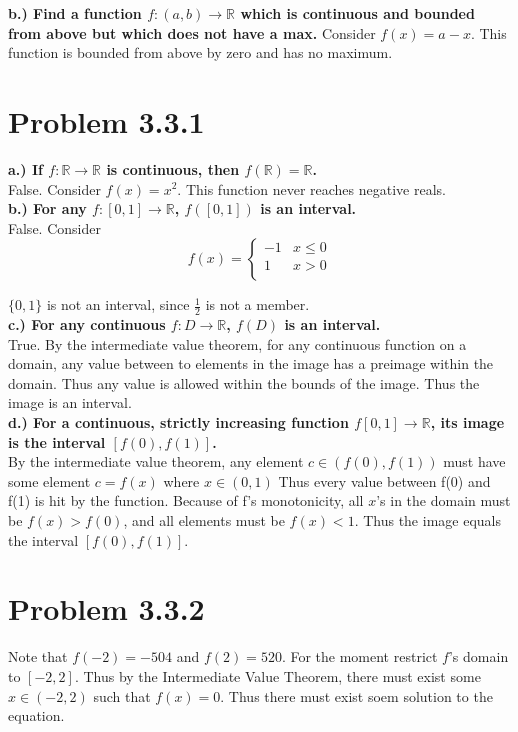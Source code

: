 \documentclass[10pt]{article} %
\begin{document}
\textbf{b.) Find a function $f:(a,b)\rightarrow\mathbb{R}$ which is continuous and bounded from above but which does not have a max.}
Consider $f(x) = a-x$. This function is bounded from above by zero and has no maximum.\\

\section{Problem 3.3.1}
\textbf{a.) If $f:\mathbb{R}\rightarrow\mathbb{R}$ is continuous, then $f(\mathbb{R}) = \mathbb{R}$.}\\
False. Consider $f(x) = x^2$. This function never reaches negative reals.\\

\textbf{b.) For any $f:[0,1]\rightarrow\mathbb{R}$, $f([0,1])$ is an interval.}\\
False. Consider\\

\[
f(x) =
\begin{cases} 
      -1 & x\leq 0 \\
      1  & x > 0 \\
   \end{cases}
\]

$\{0,1\}$ is not an interval, since $\frac12$ is not a member.\\

\textbf{c.) For any continuous $f:D\rightarrow\mathbb{R}$, $f(D)$ is an interval.}\\
True. By the intermediate value theorem, for any continuous function on a domain, any value between to elements in the image has a preimage within the domain. Thus any value is allowed within the bounds of the image. Thus the image is an interval.\\

\textbf{d.) For a continuous, strictly increasing function $f[0,1]\rightarrow\mathbb{R}$, its image is the interval $[f(0), f(1)]$.}\\
By the intermediate value theorem, any element $c \in (f(0), f(1))$ must have some element $c = f(x)$ where $x \in (0,1)$ Thus every value between f(0) and f(1) is hit by the function. Because of f's monotonicity, all $x$'s in the domain must be $f(x) > f(0)$, and all elements must be $f(x) < 1$. Thus the image equals the interval $[f(0), f(1)]$.\\

\section{Problem 3.3.2}
Note that $f(-2)=-504$ and $f(2)=520$. For the moment restrict $f$'s domain to $[-2,2]$. Thus by the Intermediate Value Theorem, there must exist some $x \in (-2, 2)$ such that $f(x) = 0$. Thus there must exist soem solution to the equation.\\
\end{document}
